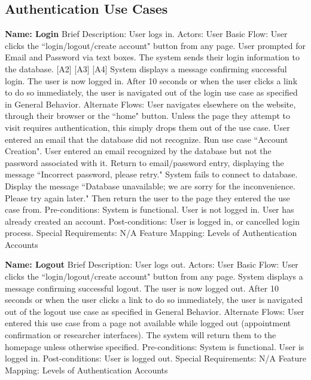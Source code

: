 \subsection{Authentication Use Cases}
\begin{outline}[enumerate]

\1 {\bf Name: Login}
\2 Brief Description: User logs in.
\2 Actors: User
\2 Basic Flow:
\3 User clicks the ``login/logout/create account" button from any page.
\3 User prompted for Email and Password via text boxes.
\3 The system sends their login information to the database. [A2] [A3] [A4]
\3 System displays a message confirming successful login.  The user is now logged in.
\3 After 10 seconds or when the user clicks a link to do so immediately, the user is navigated out of the login use case as specified in General Behavior.
\2 Alternate Flows:
\3 [A1] User navigates elsewhere on the website, through their browser or the ``home" button.  Unless the page they attempt to visit requires authentication, this simply drops them out of the use case.
\3 [A2] User entered an email that the database did not recognize.  Run use case ``Account Creation".
\3 [A3] User entered an email recognized by the database but not the password associated with it.  Return to email/password entry, displaying the message ``Incorrect password, please retry."
\3 [A4] System fails to connect to database.  Display the message ``Database unavailable; we are sorry for the inconvenience.  Please try again later."  Then return the user to the page they entered the use case from.
\2 Pre-conditions:
\3 System is functional.
\3 User is not logged in.
\3 User has already created an account.
\2 Post-conditions:
\3 User is logged in, or cancelled login process.
\2 Special Requirements:
\3 N/A
\2 Feature Mapping:
\3 Levels of Authentication
\3 Accounts

\1 {\bf Name: Logout}
\2 Brief Description: User logs out.
\2 Actors: User
\2 Basic Flow:
\3 User clicks the ``login/logout/create account" button from any page.
\3 System displays a message confirming successful logout.  The user is now logged out.
\3 After 10 seconds or when the user clicks a link to do so immediately, the user is navigated out of the logout use case as specified in General Behavior.
\2 Alternate Flows:
\3 [A1] User entered this use case from a page not available while logged out (appointment confirmation or researcher interfaces).  The system will return them to the homepage unless otherwise specified.
\2 Pre-conditions:
\3 System is functional.
\3 User is logged in.
\2 Post-conditions:
\3 User is logged out.
\2 Special Requirements:
\3 N/A
\2 Feature Mapping:
\3 Levels of Authentication
\3 Accounts


\end{outline}
